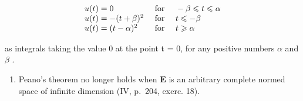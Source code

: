 \[
\begin{array}{l l} u (t) = 0 & \text { for } \quad - \beta \leqslant t \leqslant \alpha \\ u (t) = - (t + \beta) ^ {2} & \text { for } \quad t \leqslant - \beta \\ u (t) = (t - \alpha) ^ {2} & \text { for } \quad t \geqslant \alpha \end{array}
\]

as integrals taking the value 0 at the point t = 0, for any positive numbers \(\alpha\) and \(\beta\) .

\begin{enumerate}
\def\labelenumi{\arabic{enumi})}
\setcounter{enumi}{1}
\tightlist
\item
  Peano's theorem no longer holds when \(\mathbf{E}\) is an arbitrary complete normed space of infinite dimension (IV, p.~204, exerc. 18).
\end{enumerate}

